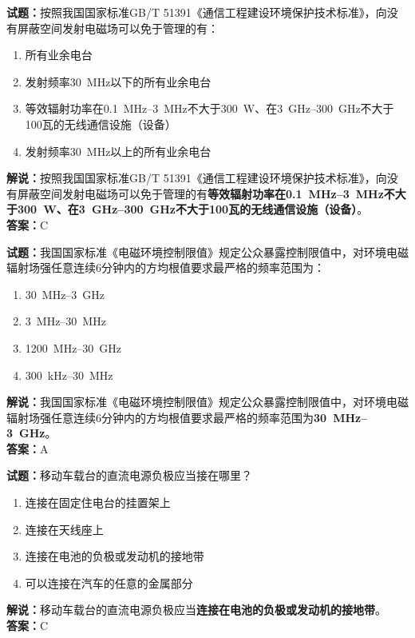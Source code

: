 \documentclass{ctexbook}
\begin{document}
\bigskip

\noindent\textbf{试题：}按照我国国家标准GB/T 51391《通信工程建设环境保护技术标准》，向没有屏蔽空间发射电磁场可以免于管理的有：
\begin{enumerate}[leftmargin=3em]
  \item 所有业余电台
  \item 发射频率\qty{30}{\MHz}以下的所有业余电台
  \item 等效辐射功率在\qtyrange{0.1}{3}{\MHz}不大于\qty{300}{\watt}、在\qtyrange{3}{300}{\GHz}不大于\num{100}瓦的无线通信设施（设备）
  \item 发射频率\qty{30}{\MHz}以上的所有业余电台
\end{enumerate}
\noindent\textbf{解说：}按照我国国家标准GB/T 51391《通信工程建设环境保护技术标准》，向没有屏蔽空间发射电磁场可以免于管理的有\textbf{等效辐射功率在\qtyrange{0.1}{3}{\MHz}不大于\qty{300}{\watt}、在\qtyrange{3}{300}{\GHz}不大于\num{100}瓦的无线通信设施（设备）}。\\\textbf{答案：}C

\bigskip

\noindent\textbf{试题：}我国国家标准《电磁环境控制限值》规定公众暴露控制限值中，对环境电磁辐射场强任意连续6分钟内的方均根值要求最严格的频率范围为：
\begin{enumerate}[leftmargin=3em]
  \item \qty{30}{\MHz}--\qty{3}{\GHz}
  \item \qty{3}{\MHz}--\qty{30}{\MHz}
  \item \qty{1200}{\MHz}--\qty{30}{\GHz}
  \item \qty{300}{\kHz}--\qty{30}{\MHz}
\end{enumerate}
\noindent\textbf{解说：}我国国家标准《电磁环境控制限值》规定公众暴露控制限值中，对环境电磁辐射场强任意连续6分钟内的方均根值要求最严格的频率范围为\textbf{\qty{30}{\MHz}--\qty{3}{\GHz}}。\\
\textbf{答案：}A

\bigskip

\noindent\textbf{试题：}移动车载台的直流电源负极应当接在哪里？
\begin{enumerate}[leftmargin=3em]
  \item 连接在固定住电台的挂置架上
  \item 连接在天线座上
  \item 连接在电池的负极或发动机的接地带
  \item 可以连接在汽车的任意的金属部分
\end{enumerate}
\noindent\textbf{解说：}移动车载台的直流电源负极应当\textbf{连接在电池的负极或发动机的接地带}。\\
\textbf{答案：}C
\end{document}
